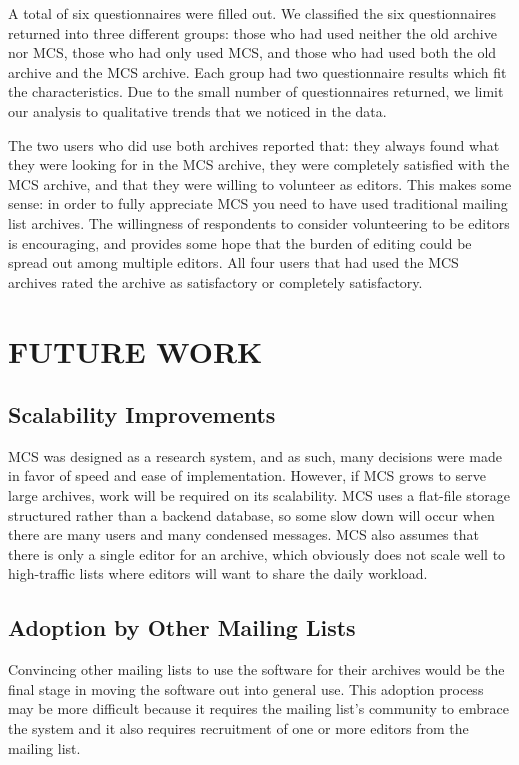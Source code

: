 A total of six questionnaires were filled out. We classified the six
questionnaires returned into three different groups: those who had used neither
the old archive nor MCS, those who had only used MCS, and those who had used
both the old archive and the MCS archive. Each group had two questionnaire
results which fit the characteristics. Due to the small number of
questionnaires returned, we limit our analysis to qualitative trends that we
noticed in the data.

The two users who did use both archives reported that: they always found what
they were looking for in the MCS archive, they were completely satisfied with
the MCS archive, and that they were willing to volunteer as editors. This makes
some sense: in order to fully appreciate MCS you need to have used traditional
mailing list archives. The willingness of respondents to consider volunteering
to be editors is encouraging, and provides some hope that the burden of editing
could be spread out among multiple editors. All four users that had used the
MCS archives rated the archive as satisfactory or completely satisfactory.

\section{FUTURE WORK}
\label{sec:future-work}

\subsection{Scalability Improvements}
MCS was designed as a research system, and as such, many decisions were made in
favor of speed and ease of implementation. However, if MCS grows to serve large
archives, work will be required on its scalability. MCS uses a flat-file
storage structured rather than a backend database, so some slow down will occur
when there are many users and many condensed messages. MCS also assumes that
there is only a single editor for an archive, which obviously does not scale
well to high-traffic lists where editors will want to share the daily workload.

\subsection{Adoption by Other Mailing Lists}
Convincing other mailing lists to use the software for their archives would be
the final stage in moving the software out into general use. This adoption
process may be more difficult because it requires the mailing list's community
to embrace the system and it also requires recruitment of one or more editors
from the mailing list.

